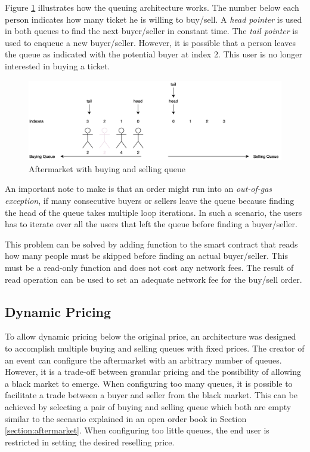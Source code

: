 Figure \ref{fig:aftermarket-queue} illustrates how the queuing architecture works. The number below each person indicates how many ticket he is willing to buy/sell. A \textit{head pointer} is used in both queues to find the next buyer/seller in constant time. The \textit{tail pointer} is used to enqueue a new buyer/seller. However, it is possible that a person leaves the queue as indicated with the potential buyer at index 2. This user is no longer interested in buying a ticket.

\begin{figure}[H]
    \centering
    \includegraphics[width=16cm]{figures/aftermarket-queue.png}
    \caption{Aftermarket with buying and selling queue}
    \label{fig:aftermarket-queue}
\end{figure}

An important note to make is that an order might run into an \textit{out-of-gas exception}, if many consecutive buyers or sellers leave the queue because finding the head of the queue takes multiple loop iterations. In such a scenario, the users has to iterate over all the users that left the queue before finding a buyer/seller. 

This problem can be solved by adding function to the smart contract that reads how many people must be skipped before finding an actual buyer/seller. This must be a read-only function and does not cost any network fees. The result of read operation can be used to set an adequate network fee for the buy/sell order. 

\subsection{Dynamic Pricing}
To allow dynamic pricing below the original price, an architecture was designed to accomplish multiple buying and selling queues with fixed prices. The creator of an event can configure the aftermarket with an arbitrary number of queues. However, it is a trade-off between granular pricing and the possibility of allowing a black market to emerge. When configuring too many queues, it is possible to facilitate a trade between a buyer and seller from the black market. This can be achieved by selecting a pair of buying and selling queue which both are empty similar to the scenario explained in an open order book in Section \ref{section:aftermarket}. When configuring too little queues, the end user is restricted in setting the desired reselling price. 

